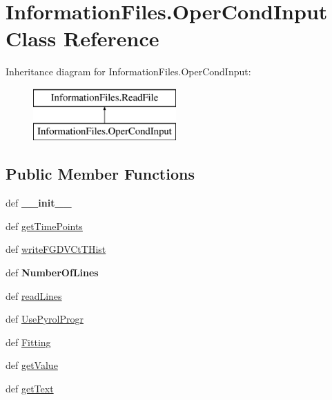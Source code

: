 \hypertarget{classInformationFiles_1_1OperCondInput}{\section{\-Information\-Files.\-Oper\-Cond\-Input \-Class \-Reference}
\label{classInformationFiles_1_1OperCondInput}
}
\-Inheritance diagram for \-Information\-Files.\-Oper\-Cond\-Input\-:\begin{figure}[H]
\begin{center}
\leavevmode
\includegraphics[height=2.000000cm]{classInformationFiles_1_1OperCondInput}
\end{center}
\end{figure}
\subsection*{\-Public \-Member \-Functions}
\begin{DoxyCompactItemize}
\item 
\hypertarget{classInformationFiles_1_1OperCondInput_af0db75c31c93a384cd7c83ee3283e8cf}{def {\bfseries \-\_\-\-\_\-init\-\_\-\-\_\-}}\label{classInformationFiles_1_1OperCondInput_af0db75c31c93a384cd7c83ee3283e8cf}

\item 
def \hyperlink{classInformationFiles_1_1OperCondInput_a993543ba04b3cda447a87931d1fef3ee}{get\-Time\-Points}
\item 
def \hyperlink{classInformationFiles_1_1OperCondInput_a57778c39c852ab2677846881031db6fc}{write\-F\-G\-D\-V\-Ct\-T\-Hist}
\item 
\hypertarget{classInformationFiles_1_1OperCondInput_ae4daea252d62f9d057c314f3bbddbb37}{def {\bfseries \-Number\-Of\-Lines}}\label{classInformationFiles_1_1OperCondInput_ae4daea252d62f9d057c314f3bbddbb37}

\item 
def \hyperlink{classInformationFiles_1_1ReadFile_a33eb756d9e63ef0f7e0ad1c175406ef0}{read\-Lines}
\item 
def \hyperlink{classInformationFiles_1_1ReadFile_a259b8dd2f0754fe46c67e1af6c82ec5d}{\-Use\-Pyrol\-Progr}
\item 
def \hyperlink{classInformationFiles_1_1ReadFile_acbbf6f298c76c66d18d56c787225fcb7}{\-Fitting}
\item 
def \hyperlink{classInformationFiles_1_1ReadFile_a2911cbdb92a645b6114feca74fc69aba}{get\-Value}
\item 
def \hyperlink{classInformationFiles_1_1ReadFile_ae3432e04c7dde26bbcdb97d4436c1d70}{get\-Text}
\end{DoxyCompactItemize}
